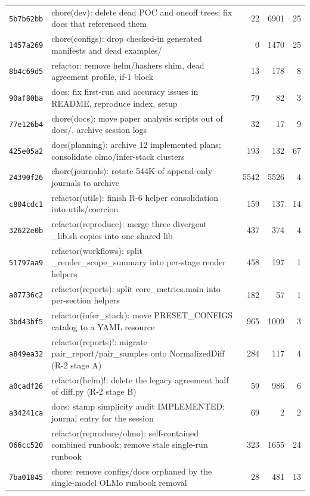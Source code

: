 \begin{longtable}{@{}p{}p{}r r r@{}}
\texttt{5b7b62bb} & chore(dev): delete dead POC and oneoff trees; fix docs that referenced them & 22 & 6901 & 25 \\
\texttt{1457a269} & chore(configs): drop checked-in generated manifests and dead examples/ & 0 & 1470 & 25 \\
\texttt{8b4c69d5} & refactor: remove helm/hashers shim, dead agreement profile, if-1 block & 13 & 178 & 8 \\
\texttt{90af80ba} & docs: fix first-run and accuracy issues in README, reproduce index, setup & 79 & 82 & 3 \\
\texttt{77e126b4} & chore(docs): move paper analysis scripts out of docs/, archive session logs & 32 & 17 & 9 \\
\texttt{425e05a2} & docs(planning): archive 12 implemented plans; consolidate olmo/infer-stack clusters & 193 & 132 & 67 \\
\texttt{24390f26} & chore(journals): rotate 544K of append-only journals to archive & 5542 & 5526 & 4 \\
\texttt{c804cdc1} & refactor(utils): finish R-6 helper consolidation into utils/coercion & 159 & 137 & 14 \\
\texttt{32622e0b} & refactor(reproduce): merge three divergent \_lib.sh copies into one shared lib & 437 & 374 & 4 \\
\texttt{51797aa9} & refactor(workflows): split \_render\_scope\_summary into per-stage render helpers & 458 & 197 & 1 \\
\texttt{a07736c2} & refactor(reports): split core\_metrics.main into per-section helpers & 182 & 57 & 1 \\
\texttt{3bd43bf5} & refactor(infer\_stack): move PRESET\_CONFIGS catalog to a YAML resource & 965 & 1009 & 3 \\
\texttt{a849ea32} & refactor(reports)!: migrate pair\_report/pair\_samples onto NormalizedDiff (R-2 stage A) & 284 & 117 & 4 \\
\texttt{a0cadf26} & refactor(helm)!: delete the legacy agreement half of diff.py (R-2 stage B) & 59 & 986 & 6 \\
\texttt{a34241ca} & docs: stamp simplicity audit IMPLEMENTED; journal entry for the session & 69 & 2 & 2 \\
\texttt{066cc520} & refactor(reproduce/olmo): self-contained combined runbook; remove stale single-run runbook & 323 & 1655 & 24 \\
\texttt{7ba01845} & chore: remove configs/docs orphaned by the single-model OLMo runbook removal & 28 & 481 & 13 \\
\bottomrule\end{longtable}
